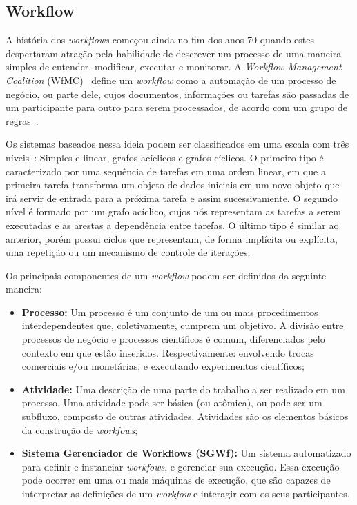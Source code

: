 \documentclass[12pt]{report} %
\begin{document}
	\subsection{Workflow}
	
	    A história dos \textit{workflows} começou ainda no fim dos anos 70 quando estes despertaram atração pela habilidade de descrever um processo de uma maneira simples de entender, modificar, executar e monitorar.
	    A \textit{Workflow Management Coalition} (WfMC)~\cite{wfmc:website} define um \textit{workflow} como a automação de um processo de negócio, ou parte dele, cujos documentos, informações ou tarefas são passadas de um participante para outro para serem processados, de acordo com um grupo de regras~\cite{Slomiski06}.

	    Os sistemas baseados nessa ideia podem ser classificados em uma escala com três níveis~\cite{FOX06}: Simples e linear, grafos acíclicos e grafos cíclicos.
	    O primeiro tipo é caracterizado por uma sequência de tarefas em uma ordem linear, em que a primeira tarefa transforma um objeto de dados iniciais em um novo objeto que irá servir de entrada para a próxima tarefa e assim sucessivamente.
	    O segundo nível é formado por um grafo acíclico, cujos nós representam as tarefas a serem executadas e as arestas a dependência entre tarefas.
	    O último tipo é similar ao anterior, porém possui ciclos que representam, de forma implícita ou explícita, uma repetição ou um mecanismo de controle de iterações.

	    Os principais componentes de um \textit{workflow} podem ser definidos da seguinte maneira:
	    
	    \begin{itemize}
		\item \textbf{Processo:} Um processo é um conjunto de um ou mais procedimentos interdependentes que, coletivamente, cumprem um objetivo.
			A divisão entre processos de negócio e processos científicos é comum, diferenciados pelo contexto em que estão inseridos.
			Respectivamente: envolvendo trocas comerciais e/ou monetárias; e executando experimentos científicos;

		\item \textbf{Atividade:} Uma descrição de uma parte do trabalho a ser realizado em um processo.
			Uma atividade pode ser básica (ou atômica), ou pode ser um subfluxo, composto de outras atividades.
			Atividades são os elementos básicos da construção de \textit{workfows};
						    
		\item \textbf{Sistema Gerenciador de Workflows (SGWf):}  Um sistema automatizado para definir e instanciar \textit{workfows}, e gerenciar sua execução.
			Essa execução pode ocorrer em uma ou mais máquinas de execução, que são capazes de interpretar as definições de um \textit{workfow} e interagir com os seus participantes.
	    \end{itemize}            
				    
\end{document}
